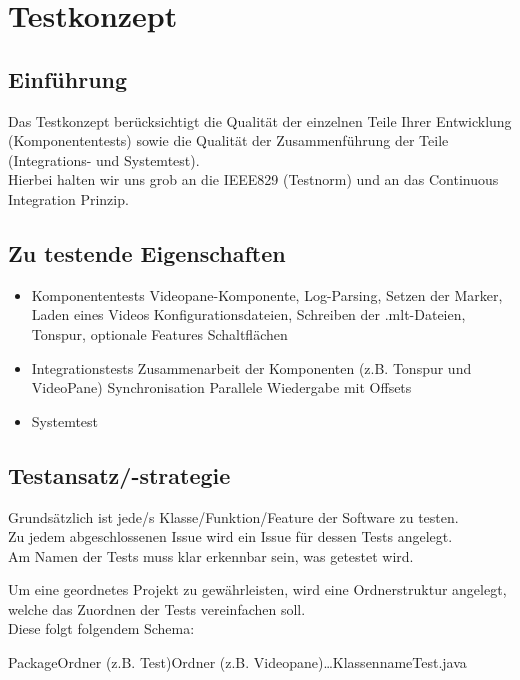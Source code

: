 \chapter{Testkonzept}
\section{Einführung}
Das Testkonzept berücksichtigt die Qualität der einzelnen Teile Ihrer Entwicklung (Komponententests)
sowie die Qualität der Zusammenführung der Teile (Integrations- und Systemtest).\\
Hierbei halten wir uns grob an die IEEE829 (Testnorm) und an das Continuous Integration Prinzip.

\setlength{\itemsep}{-2pt} 
\section{Zu testende Eigenschaften}
\begin{itemize}
	\item Komponententests
	\subitem Videopane-Komponente, Log-Parsing, Setzen der Marker, Laden eines Videos
	\subitem Konfigurationsdateien, Schreiben der .mlt-Dateien, Tonspur, optionale Features
	\subitem Schaltflächen
	\item Integrationstests
	\subitem Zusammenarbeit der Komponenten (z.B. Tonspur und VideoPane)
	\subitem Synchronisation
	\subitem Parallele Wiedergabe mit Offsets
	\item Systemtest
\end{itemize}
\setlength{\itemsep}{0pt} 

\section{Testansatz/-strategie}
Grundsätzlich ist jede/s  Klasse/Funktion/Feature der Software zu testen.\\
Zu jedem abgeschlossenen Issue wird ein Issue für dessen Tests angelegt.\\
Am Namen der Tests muss klar erkennbar sein, was getestet wird.

Um eine geordnetes Projekt zu gewährleisten, wird eine Ordnerstruktur angelegt, 
welche das Zuordnen der Tests vereinfachen soll. \\
Diese folgt folgendem Schema:
\begin{center}
	Package\rightarrow Ordner (z.B. Test)\rightarrow Ordner (z.B. Videopane)\rightarrow\dots\rightarrow KlassennameTest.java
\end{center}


